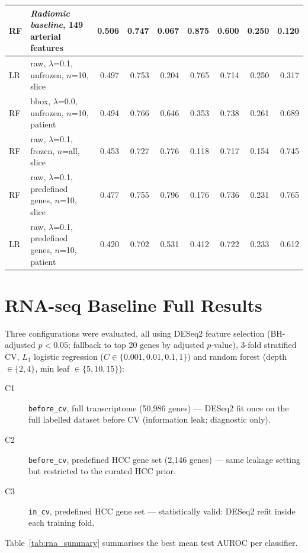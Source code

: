 \documentclass[12pt,twoside]{report}
\begin{document}
\begin{appendices}
\begin{table}[H]
{\begin{tabular}{llrrrrrrr}
\hline
RF & \textit{Radiomic baseline}, 149 arterial features                 & 0.506 & 0.747 & 0.067 & 0.875 & 0.600 & 0.250 & 0.120 \\
\hline
LR & raw, $\lambda$=0.1, unfrozen, $n$=10, slice                      & 0.497 & 0.753 & 0.204 & 0.765 & 0.714 & 0.250 & 0.317 \\
RF & bbox, $\lambda$=0.0, unfrozen, $n$=10, patient                   & 0.494 & 0.766 & 0.646 & 0.353 & 0.738 & 0.261 & 0.689 \\
RF & raw, $\lambda$=0.1, frozen, $n$=all, slice                       & 0.453 & 0.727 & 0.776 & 0.118 & 0.717 & 0.154 & 0.745 \\
RF & raw, $\lambda$=0.1, predefined genes, $n$=10, slice              & 0.477 & 0.755 & 0.796 & 0.176 & 0.736 & 0.231 & 0.765 \\
LR & raw, $\lambda$=0.1, predefined genes, $n$=10, patient            & 0.420 & 0.702 & 0.531 & 0.412 & 0.722 & 0.233 & 0.612 \\
\hline
\end{tabular}%
}
\end{table}


\chapter{RNA-seq Baseline Full Results}
\label{app:rna_baseline_plots}

Three configurations were evaluated, all using DESeq2 feature selection
(BH-adjusted $p < 0.05$; fallback to top 20 genes by adjusted $p$-value),
3-fold stratified CV, $L_1$ logistic regression ($C \in \{0.001, 0.01, 0.1, 1\}$)
and random forest (depth $\in \{2, 4\}$, min leaf $\in \{5, 10, 15\}$):

\begin{description}
  \item[C1] \texttt{before\_cv}, full transcriptome (50,986 genes) — DESeq2 fit once on the
    full labelled dataset before CV (information leak; diagnostic only).
  \item[C2] \texttt{before\_cv}, predefined HCC gene set (2,146 genes) — same leakage
    setting but restricted to the curated HCC prior.
  \item[C3] \texttt{in\_cv}, predefined HCC gene set — statistically valid: DESeq2 refit
    inside each training fold.
\end{description}

\noindent Table~\ref{tab:rna_summary} summarises the best mean test AUROC per classifier.


\end{appendices}
\end{document}
